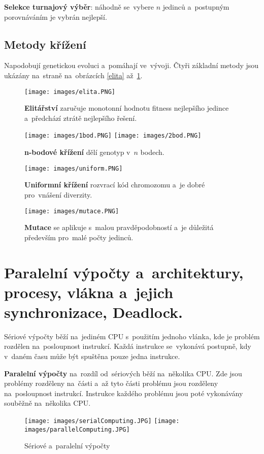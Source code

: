 \textbf{Selekce turnajový výběr}: náhodně se~vybere \( n \) jedinců a~postupným porovnáváním je vybrán nejlepší.

\subsection{Metody křížení}

Napodobují genetickou evoluci a~pomáhají ve~vývoji. Čtyři základní metody jsou ukázány na~straně \pageref{elita} na~obrázcích \ref{elita} až~\ref{mutace}.

\begin{figure}[ht]
	\centering
	\texttt{[image: images/elita.PNG]}
	\caption{\textbf{Elitářství} zaručuje monotonní hodnotu fitness nejlepšího jedince a~předchází ztrátě nejlepšího řešení.}
	\label{elita}

	\texttt{[image: images/1bod.PNG]}
	\texttt{[image: images/2bod.PNG]}
	\caption{\textbf{n-bodové křížení} dělí genotyp v~\( n \) bodech.}
	\label{1bod2bod}

	\texttt{[image: images/uniform.PNG]}
	\caption{\textbf{Uniformní křížení} rozvrací kód chromozomu a~je dobré pro~vnášení diverzity.}
	\label{uniform}

	\texttt{[image: images/mutace.PNG]}
	\caption{\textbf{Mutace} se aplikuje s~malou pravděpodobností a~je důležitá především pro~malé počty jedinců.}
	\label{mutace}
\end{figure}

\clearpage
\section{Paralelní výpočty a~architektury, procesy, vlákna a~jejich synchronizace, Deadlock.}

Sériové výpočty běží na~jediném CPU s~použitím jednoho vlánka, kde je problém rozdělen na~posloupnost instrukcí. Každá instrukce se~vykonává postupně, kdy v~daném času může být spuštěna pouze jedna instrukce.

\textbf{Paralelní výpočty} na~rozdíl od~sériových běží na~několika CPU. Zde jsou problémy rozděleny na~části a~až tyto části problému jsou rozděleny na~posloupnost instrukcí. Instrukce každého problému jsou poté vykonávány souběžně na~několika CPU.

\begin{figure}[ht]
	\centering
	\texttt{[image: images/serialComputing.JPG]}
	\hspace*{1em}
	\texttt{[image: images/parallelComputing.JPG]}

	\caption{Sériové a~paralelní výpočty}
\end{figure}

